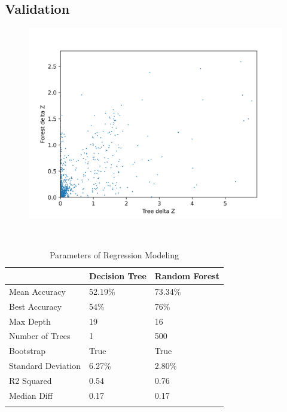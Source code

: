 \documentclass{beamer}
\begin{document}
\subsection{Validation}
\begin{frame}
    \begin{figure}
        \includegraphics[scale=0.65]{img/deltaZ.png}
    \end{figure}
    \end{frame}
\begin{frame}
    \begin{table}[ht]\
        \caption*{Parameters of Regression Modeling} %
        \centering %
        \begin{tabular}{l l l} %
        \hline\hline %
         &Decision Tree & Random Forest\\ [0.5ex] %
        \hline %
        Mean Accuracy& 52.19\%  & 73.34\%  \\ %
        Best Accuracy & 54\% & 76\%  \\
        Max Depth & 19 & 16  \\
        Number of Trees &  1 & 500  \\
        Bootstrap &  True & True  \\
        Standard Deviation &   6.27\% & 2.80\%  \\
        R2 Squared &  0.54 & 0.76  \\
        Median Diff &  0.17 & 0.17  \\ [1ex] %
        \hline %
        \\
        \end{tabular}
        \end{table}       
        \end{frame}
\end{document}
